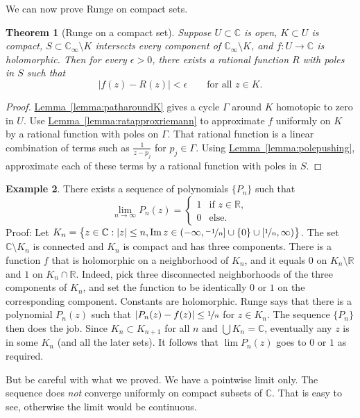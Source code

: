 \documentclass[12pt,openany]{book}
\renewcommand{\Im}{\operatorname{Im}}
\newcommand{\sabs}[1]{\lvert {#1} \rvert}
\newcommand{\abs}[1]{\left\lvert {#1} \right\rvert}
\newcommand{\C}{{\mathbb{C}}}
\newcommand{\R}{{\mathbb{R}}}
\theoremstyle{plain}
\newtheorem{thm}{Theorem}[section]
\theoremstyle{remark}
\theoremstyle{definition}
\theoremstyle{exercise}
\theoremstyle{example}
\newtheorem{example}[thm]{Example}
\newcommand{\lemmaref}[1]{\hyperref[#1]{Lemma~\ref*{#1}}}
\begin{document}
We can now prove Runge on compact sets.

\begin{thm}[Runge on a compact set]%
\label{thm:rungecpt}
Suppose $U \subset \C$ is open, $K \subset U$ is compact, $S \subset \C_{\infty} \setminus K$
intersects every component of $\C_\infty \setminus K$,
and $f \colon U \to \C$ is holomorphic.
Then for every $\epsilon > 0$,
there exists a rational function $R$ with poles in $S$ such that
\begin{equation*}
\abs{f(z)-R(z)} < \epsilon \qquad \text{for all $z \in K$.}
\end{equation*}
\end{thm}

\begin{proof}
\lemmaref{lemma:patharoundK} gives a cycle $\Gamma$
around $K$ homotopic
to zero in $U$.  Use \lemmaref{lemma:ratapproxriemann} to approximate
$f$ uniformly on $K$ by a rational function with poles on $\Gamma$.
That rational function is a linear combination of
terms such as $\frac{1}{z-p_j}$ for $p_j \in \Gamma$.
Using \lemmaref{lemma:polepushing}, approximate each of these terms
by a rational function with poles in $S$.
\end{proof}

\begin{example}
There exists a sequence of polynomials $\{ P_n \}$ such that
\begin{equation*}
\lim_{n \to \infty} P_n(z)
=
\begin{cases}
1 & \text{if } z \in \R, \\
0 & \text{else.}
\end{cases}
\end{equation*}
Proof: Let $K_n = \bigl\{ z \in \C : \sabs{z} \leq n, \Im z \in
(-\infty,\nicefrac{-1}{n}] \cup \{ 0 \} \cup
[\nicefrac{1}{n},\infty) \bigr\}$.  The set $\C \setminus K_n$ is connected and
$K_n$ is compact and has three components.  There is a function $f$
that is holomorphic on a neighborhood of $K_n$, and it equals $0$ on $K_n \setminus \R$
and $1$ on $K_n \cap \R$.
Indeed, pick three disconnected neighborhoods of the three components of
$K_n$, and set the function to be identically $0$ or $1$ on the corresponding
component.  Constants are holomorphic.
Runge says that there is a polynomial $P_n(z)$ such that $\sabs{P_n(z)-f(z)}
\leq \nicefrac{1}{n}$ for $z \in K_n$.  The sequence $\{ P_n \}$ then does
the job.  Since $K_n \subset K_{n+1}$ for all $n$ and $\bigcup K_n = \C$,
eventually any $z$ is in some $K_n$ (and all the later sets).
It follows that $\lim P_n(z)$ goes to $0$ or $1$ as required.

But be careful with what we proved.  We have a pointwise limit only.  The sequence
does \emph{not} converge uniformly on compact subsets of $\C$.  That is easy to see,
otherwise the limit would be continuous.
\end{example}
\end{document}
